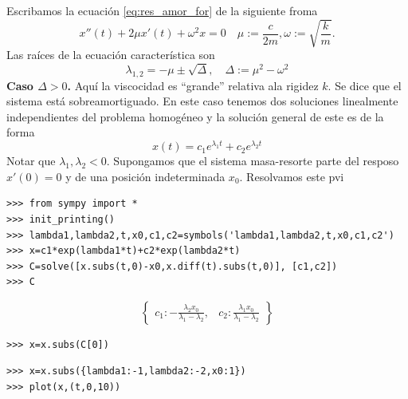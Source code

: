 Escribamos la ecuación \eqref{eq:res_amor_for} de la siguiente froma
\begin{equation}\label{eq:res_amor}
\boxed{x''(t)+2\mu x'(t)+\omega^2x=0}\quad
\mu:=\frac{c}{2m},\omega:=\sqrt{\frac{k}{m}}.
\end{equation}
Las raíces de la ecuación característica   son
\[
\boxed{\lambda_{1,2}=-\mu\pm\sqrt{\Delta},\quad \Delta:=\mu^2-\omega^2}
\]
\textbf{Caso $\Delta>0$.} Aquí la viscocidad es ``grande'' relativa ala rigidez
$k$. Se dice que el sistema está sobreamortiguado.
En este caso tenemos dos soluciones
linealmente independientes del problema homogéneo y la solución general de
este es de la forma
\[x(t)=c_1e^{\lambda_1t}+c_2e^{\lambda_2t}\]
Notar que $\lambda_1,\lambda_2<0$. Supongamos que el sistema masa-resorte parte
del resposo $x'(0)=0$ y de una posición indeterminada $x_0$. Resolvamos este pvi

\begin{lstlisting}
>>> from sympy import *
>>> init_printing()
>>> lambda1,lambda2,t,x0,c1,c2=symbols('lambda1,lambda2,t,x0,c1,c2')
>>> x=c1*exp(lambda1*t)+c2*exp(lambda2*t)
>>> C=solve([x.subs(t,0)-x0,x.diff(t).subs(t,0)], [c1,c2])
>>> C
\end{lstlisting}

\[\begin{Bmatrix}c_{1} : - \frac{\lambda_{2} x_{0}}{\lambda_{1} -
\lambda_{2}}, & c_{2} : \frac{\lambda_{1} x_{0}}{\lambda_{1} -
\lambda_{2}}\end{Bmatrix}\]

\begin{lstlisting}
>>> x=x.subs(C[0])
\end{lstlisting}


\begin{lstlisting}
>>> x=x.subs({lambda1:-1,lambda2:-2,x0:1})
>>> plot(x,(t,0,10))
\end{lstlisting}


